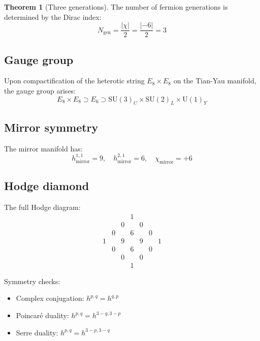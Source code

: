 \documentclass[12pt,a4paper,twoside]{article}
\newcommand{\SU}{\mathrm{SU}}
\newcommand{\Uone}{\mathrm{U}(1)}
\newcommand{\checkmarkgreen}{\textcolor{emerald}{\checkmark}}
\theoremstyle{definition}
\newtheorem{theorem}{Theorem}[section]
\begin{document}
\begin{theorem}[Three generations]
The number of fermion generations is determined by the Dirac index:
\begin{equation}
\boxed{
N_{\text{gen}} = \frac{|\chi|}{2} = \frac{|-6|}{2} = 3
}
\label{eq:generations}
\end{equation}
\end{theorem}

\subsection{Gauge group}

Upon compactification of the heterotic string $E_8 \times E_8$ on the Tian-Yau manifold, the gauge group arises:
\begin{equation}
E_8 \times E_8 \supset E_6 \supset \SU(3)_C \times \SU(2)_L \times \Uone_Y
\label{eq:gauge_chain}
\end{equation}

\subsection{Mirror symmetry}

The mirror manifold has:
\begin{equation}
h^{1,1}_{\text{mirror}} = 9, \quad h^{2,1}_{\text{mirror}} = 6, \quad \chi_{\text{mirror}} = +6
\end{equation}

\subsection{Hodge diamond}

The full Hodge diagram:
\begin{equation}
\begin{matrix}
& & & 1 & & & \\
& & 0 & & 0 & & \\
& 0 & & 6 & & 0 & \\
1 & & 9 & & 9 & & 1 \\
& 0 & & 6 & & 0 & \\
& & 0 & & 0 & & \\
& & & 1 & & &
\end{matrix}
\label{eq:hodge_diamond}
\end{equation}

Symmetry checks:
\begin{itemize}
    \item Complex conjugation: $h^{p,q} = h^{q,p}$ \checkmarkgreen
    \item Poincaré duality: $h^{p,q} = h^{3-q,3-p}$ \checkmarkgreen
    \item Serre duality: $h^{p,q} = h^{3-p,3-q}$ \checkmarkgreen
\end{itemize}
\end{document}
